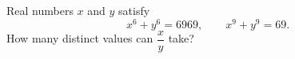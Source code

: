 Real numbers $x$ and $y$ satisfy
\[
x^6+y^6=6969,\qquad x^9+y^9=69 .
\]
How many distinct values can $\dfrac {x}{y}$ take?
